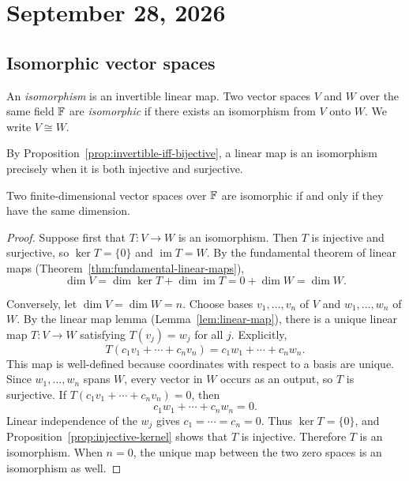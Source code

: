 \section{September 28, 2026}

\subsection{Isomorphic vector spaces}

\begin{definition}[Isomorphism]
  An \emph{isomorphism} is an invertible linear map. Two vector spaces
  $V$ and $W$ over the same field $\mathbb{F}$ are \emph{isomorphic} if
  there exists an isomorphism from $V$ onto $W$. We write $V\cong W$.
\end{definition}

By Proposition~\ref{prop:invertible-iff-bijective}, a linear map is an
isomorphism precisely when it is both injective and surjective.

\begin{proposition}\label{prop:isomorphic-iff-equal-dimension}
  Two finite-dimensional vector spaces over $\mathbb{F}$ are isomorphic
  if and only if they have the same dimension.
\end{proposition}

\begin{proof}
  Suppose first that $T\colon V\to W$ is an isomorphism. Then $T$ is
  injective and surjective, so $\ker T=\{0\}$ and
  $\operatorname{im}T=W$. By the fundamental theorem of linear maps
  (Theorem~\ref{thm:fundamental-linear-maps}),
  \[
    \dim V=\dim\ker T+\dim\operatorname{im}T
      =0+\dim W=\dim W.
  \]

  Conversely, let $\dim V=\dim W=n$. Choose bases
  $v_1,\ldots,v_n$ of $V$ and $w_1,\ldots,w_n$ of $W$. By the
  linear map lemma (Lemma~\ref{lem:linear-map}), there is a unique
  linear map $T\colon V\to W$ satisfying $T(v_j)=w_j$ for all $j$.
  Explicitly,
  \[
    T(c_1v_1+\cdots+c_nv_n)=c_1w_1+\cdots+c_nw_n.
  \]
  This map is well-defined because coordinates with respect to a
  basis are unique. Since $w_1,\ldots,w_n$ spans $W$, every vector
  in $W$ occurs as an output, so $T$ is surjective. If
  $T(c_1v_1+\cdots+c_nv_n)=0$, then
  \[
    c_1w_1+\cdots+c_nw_n=0.
  \]
  Linear independence of the $w_j$ gives $c_1=\cdots=c_n=0$.
  Thus $\ker T=\{0\}$, and Proposition~\ref{prop:injective-kernel}
  shows that $T$ is injective. Therefore $T$ is an isomorphism.
  When $n=0$, the unique map between the two zero spaces is an
  isomorphism as well.
\end{proof}

